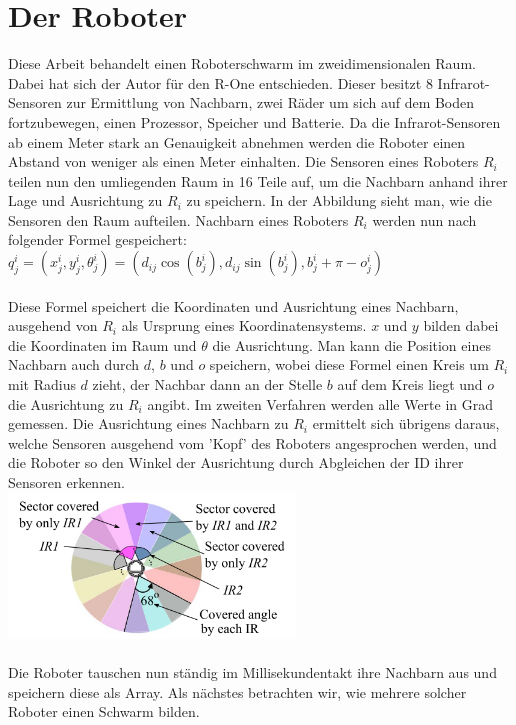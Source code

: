 \section{Der Roboter}

Diese Arbeit behandelt einen Roboterschwarm im zweidimensionalen Raum. Dabei hat sich der Autor für den 
R-One entschieden. Dieser besitzt 8 Infrarot-Sensoren zur Ermittlung von Nachbarn, zwei Räder um sich
auf dem Boden fortzubewegen, einen Prozessor, Speicher und Batterie. Da die Infrarot-Sensoren ab einem
Meter stark an Genauigkeit abnehmen werden die Roboter einen Abstand von weniger als einen Meter einhalten.
Die Sensoren eines Roboters $R_i$ teilen nun den umliegenden Raum in 16 Teile auf, um die Nachbarn anhand 
ihrer Lage und Ausrichtung zu $R_i$ zu speichern. In der Abbildung sieht man, wie die Sensoren den Raum
aufteilen. Nachbarn eines Roboters $R_i$ werden nun nach folgender Formel gespeichert:\\

$q_j^i=(x_j^i,y_j^i,\theta_j^i)=(d_{ij}\cos(b_j^i),d_{ij}\sin(b_j^i),b_j^i+\pi-o_j^i)$\\\\
Diese Formel speichert die Koordinaten und Ausrichtung eines Nachbarn, ausgehend von $R_i$ als Ursprung
eines Koordinatensystems. $x$ und $y$ bilden dabei die Koordinaten im Raum und $\theta$ die Ausrichtung.
Man kann die Position eines Nachbarn auch durch $d$, $b$ und $o$ speichern, wobei diese Formel einen Kreis
um $R_i$ mit Radius $d$ zieht, der Nachbar dann an der Stelle $b$ auf dem Kreis liegt und $o$ die
Ausrichtung zu $R_i$ angibt. Im zweiten Verfahren werden alle Werte in Grad gemessen. Die Ausrichtung eines
Nachbarn zu $R_i$ ermittelt sich übrigens daraus, welche Sensoren ausgehend vom 'Kopf' des Roboters
angesprochen werden, und die Roboter so den Winkel der Ausrichtung durch Abgleichen der ID ihrer Sensoren
erkennen.\\

\includegraphics[width=3in]{images/Screenshot 2023-02-16 at 11.53.03 AM.png}\\\\
Die Roboter tauschen nun ständig im Millisekundentakt ihre Nachbarn aus und speichern diese als Array.
Als nächstes betrachten wir, wie mehrere solcher Roboter einen Schwarm bilden.